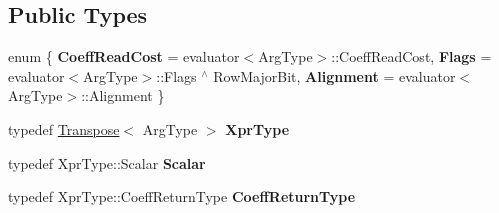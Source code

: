 \subsection*{Public Types}
\begin{DoxyCompactItemize}
\item 
\mbox{\label{struct_eigen_1_1internal_1_1unary__evaluator_3_01_transpose_3_01_arg_type_01_4_00_01_index_based_01_4_aa6613a84423b3594fa9fe14626cd3940}} 
enum \{ {\bfseries Coeff\+Read\+Cost} = evaluator$<$Arg\+Type$>$\+::Coeff\+Read\+Cost, 
{\bfseries Flags} = evaluator$<$Arg\+Type$>$\+::Flags $^\wedge$ Row\+Major\+Bit, 
{\bfseries Alignment} = evaluator$<$Arg\+Type$>$\+::Alignment
 \}
\item 
\mbox{\label{struct_eigen_1_1internal_1_1unary__evaluator_3_01_transpose_3_01_arg_type_01_4_00_01_index_based_01_4_aaad78806253598991f290281fc80154e}} 
typedef \mbox{\hyperlink{class_eigen_1_1_transpose}{Transpose}}$<$ Arg\+Type $>$ {\bfseries Xpr\+Type}
\item 
\mbox{\label{struct_eigen_1_1internal_1_1unary__evaluator_3_01_transpose_3_01_arg_type_01_4_00_01_index_based_01_4_a64946df51088cc9e1ed89e47fc61d33c}} 
typedef Xpr\+Type\+::\+Scalar {\bfseries Scalar}
\item 
\mbox{\label{struct_eigen_1_1internal_1_1unary__evaluator_3_01_transpose_3_01_arg_type_01_4_00_01_index_based_01_4_a29ac036c7acef87f765dd49e70d190ee}} 
typedef Xpr\+Type\+::\+Coeff\+Return\+Type {\bfseries Coeff\+Return\+Type}
\end{DoxyCompactItemize}
